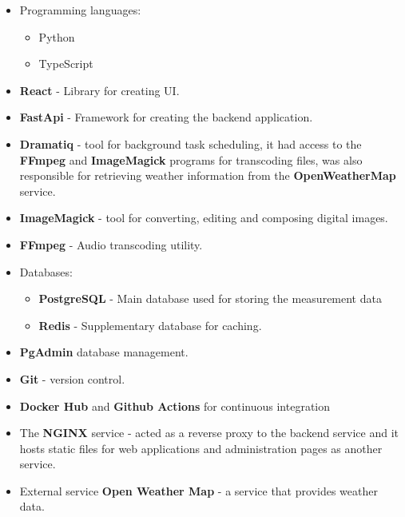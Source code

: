 \documentclass[a4paper,10pt]{article}
\begin{document}
\begin{multicols}{2}
  \begin{itemize}
    \item Programming languages:
      \begin{itemize}
        \item Python
        \item TypeScript
      \end{itemize}
    \item \textbf{React} - Library for creating UI.
    \item \textbf{FastApi} - Framework for creating the backend application.
    \item \textbf{Dramatiq} - tool for background task scheduling, it had access
      to the \textbf{FFmpeg} and \textbf{ImageMagick} programs for transcoding
      files, was also responsible for retrieving weather information from the
      \textbf{OpenWeatherMap} service.
    \item \textbf{ImageMagick} - tool for converting, editing and composing
      digital images.
    \item \textbf{FFmpeg} - Audio transcoding utility.
    \item Databases:
      \begin{itemize}
        \item \textbf{PostgreSQL} - Main database used for storing the
          measurement data
        \item \textbf{Redis} - Supplementary database for caching.
      \end{itemize}
    \item \textbf{PgAdmin} database management.
    \item \textbf{Git} - version control.
    \item \textbf{Docker Hub} and \textbf{Github Actions} for continuous
      integration
    \item The \textbf{NGINX} service - acted as a reverse proxy to the backend
      service and it hosts static files for web applications and administration
      pages as another service.
    \item External service \textbf{Open Weather Map} - a service that provides
      weather data.
  \end{itemize}
\end{multicols}
\end{document}
